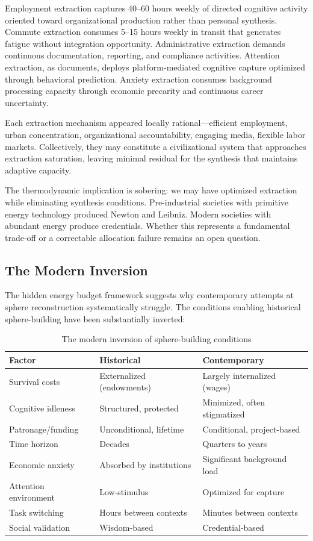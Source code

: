 Employment extraction captures 40--60 hours weekly of directed cognitive activity oriented toward organizational production rather than personal synthesis. Commute extraction consumes 5--15 hours weekly in transit that generates fatigue without integration opportunity. Administrative extraction demands continuous documentation, reporting, and compliance activities. Attention extraction, as \citet{zuboff2019} documents, deploys platform-mediated cognitive capture optimized through behavioral prediction. Anxiety extraction consumes background processing capacity through economic precarity and continuous career uncertainty.

Each extraction mechanism appeared locally rational---efficient employment, urban concentration, organizational accountability, engaging media, flexible labor markets. Collectively, they may constitute a civilizational system that approaches extraction saturation, leaving minimal residual for the synthesis that maintains adaptive capacity.

The thermodynamic implication is sobering: we may have optimized extraction while eliminating synthesis conditions. Pre-industrial societies with primitive energy technology produced Newton and Leibniz. Modern societies with abundant energy produce credentials. Whether this represents a fundamental trade-off or a correctable allocation failure remains an open question.

\subsection{The Modern Inversion}

The hidden energy budget framework suggests why contemporary attempts at sphere reconstruction systematically struggle. The conditions enabling historical sphere-building have been substantially inverted:

\begin{table}[htbp]
\centering
\caption{The modern inversion of sphere-building conditions}
\begin{tabular}{lll}
\toprule
\textbf{Factor} & \textbf{Historical} & \textbf{Contemporary} \\
\midrule
Survival costs & Externalized (endowments) & Largely internalized (wages) \\
Cognitive idleness & Structured, protected & Minimized, often stigmatized \\
Patronage/funding & Unconditional, lifetime & Conditional, project-based \\
Time horizon & Decades & Quarters to years \\
Economic anxiety & Absorbed by institutions & Significant background load \\
Attention environment & Low-stimulus & Optimized for capture \\
Task switching & Hours between contexts & Minutes between contexts \\
Social validation & Wisdom-based & Credential-based \\
\bottomrule
\end{tabular}
\label{tab:modern-inversion}
\end{table}

